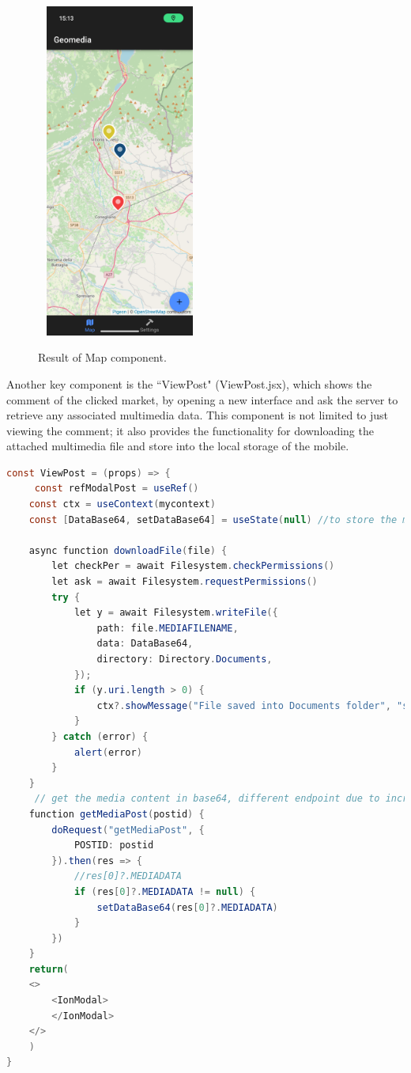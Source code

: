 \documentclass[conference]{IEEEtran}
\begin{document}
\begin{figure}[htbp]
\begin{center}
{\includegraphics[width=5.5cm, height=11cm]{imgs/Map.png}}
\end{center}
\caption{Result of Map component.}
\label{fig}
\end{figure}


Another key component is the ``ViewPost" (ViewPost.jsx), which shows the comment of the clicked market, by opening a new interface and ask the server to retrieve any associated multimedia data.
This component is not limited to just viewing the comment; it also provides the functionality for downloading the attached multimedia file and store into the local storage of the mobile.


\begin{lstlisting}[language=Java, caption=ViewPost]
const ViewPost = (props) => {
     const refModalPost = useRef()
    const ctx = useContext(mycontext)
    const [DataBase64, setDataBase64] = useState(null) //to store the mediafile attached

    async function downloadFile(file) {
        let checkPer = await Filesystem.checkPermissions()
        let ask = await Filesystem.requestPermissions()
        try {
            let y = await Filesystem.writeFile({
                path: file.MEDIAFILENAME,
                data: DataBase64,
                directory: Directory.Documents,
            });
            if (y.uri.length > 0) {
                ctx?.showMessage("File saved into Documents folder", "success")
            }
        } catch (error) {
            alert(error)
        }
    }
     // get the media content in base64, different endpoint due to increment performance
    function getMediaPost(postid) {
        doRequest("getMediaPost", {
            POSTID: postid
        }).then(res => {
            //res[0]?.MEDIADATA
            if (res[0]?.MEDIADATA != null) {
                setDataBase64(res[0]?.MEDIADATA)
            }
        })
    }
    return(
    <>
        <IonModal>
        </IonModal>
    </>
    )
}
\end{lstlisting}
\end{document}
